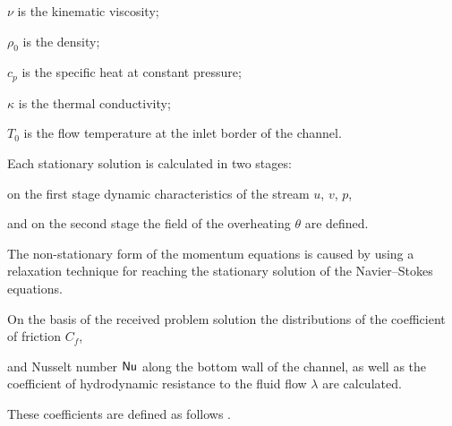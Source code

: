 $\nu$ is the kinematic viscosity; 

$\rho_0$ is the density; 

$c_p$ is the specific heat at constant pressure; 

$\kappa$ is the thermal conductivity; 

$T_0$ is the flow temperature at the inlet border of the channel.  



Each stationary solution is calculated in two stages: 

on the first stage dynamic charac\-te\-ris\-tics of the stream $u$, $v$, $p$, 

and on the second stage the field of the overheating $\theta$ are defined.  

The non-stationary form of the momentum equations is caused by using a relaxation technique for reaching the stationary solution of the Navier--Stokes equations. 

On the basis of the received problem solution the distributions of the coefficient of friction $C_f$, 

and Nusselt number ${\sf Nu}$ along the bottom wall of the channel, as well as the coefficient of hydrodynamic resistance to the fluid flow $\lambda$ are calculated. 

These coefficients are defined as follows \cite{Valencia,TrhBat2006,AbuNada,Loits}.





